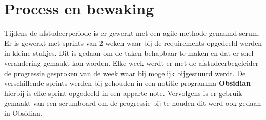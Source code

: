 \section{Process en bewaking}
Tijdens de afstudeerperiode is er gewerkt met een agile methode genaamd scrum.
Er is gewerkt met sprints van 2 weken waar bij de requirements opgedeeld werden in kleine stukjes.
Dit is gedaan om de taken behapbaar te maken en dat er snel verandering gemaakt kon worden.
Elke week werdt er met de afstudeerbegeleider de progressie gesproken van de week waar bij mogelijk bijgestuurd werdt.
De verschillende sprints werden bij gehouden in een notitie programma \textbf{Obsidian} hierbij is elke sprint opgedeeld in een apparte note.
Vervolgens is er gebruik gemaakt van een scrumboard om de progressie bij te houden dit werd ook gedaan in Obsidian.

